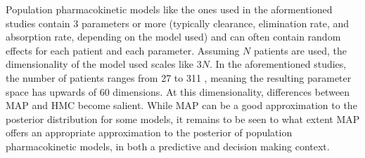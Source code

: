 Population pharmacokinetic models like the ones used in the aformentioned studies \cite{luque2019population, Stifft2020-uq, gao2021population} contain 3 parameters or more (typically clearance, elimination rate, and absorption rate, depending on the model used) and can often contain random effects for each patient and each parameter.  Assuming $N$ patients are used, the dimensionality of the model used scales like $3N$.  In the aforementioned studies, the number of patients ranges from 27 \cite{Stifft2020-uq} to 311 \cite{gao2021population}, meaning the resulting parameter space has upwards of 60 dimensions.  At this dimensionality, differences between MAP and HMC become salient. While MAP can be a good approximation to the posterior distribution for some models, it remains to be seen to what extent MAP offers an appropriate approximation to the posterior of population pharmacokinetic models, in both a predictive and decision making context.  